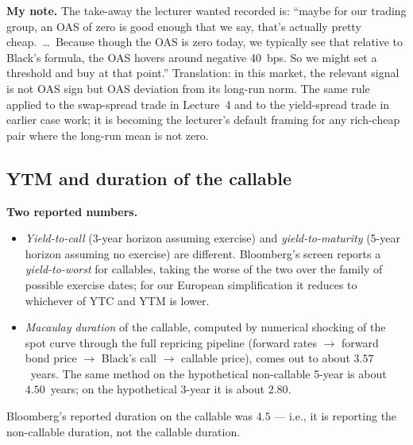 \begin{checkpoint}
\textbf{My note.} The take-away the lecturer wanted recorded is:
``maybe for our trading group, an OAS of zero is good enough that we
say, that's actually pretty cheap.\ \ldots\ Because though the OAS is
zero today, we typically see that relative to Black's formula, the
OAS hovers around negative 40~bps. So we might set a threshold and
buy at that point.'' Translation: in this market, the relevant signal
is not OAS sign but OAS deviation from its long-run norm. The same
rule applied to the swap-spread trade in Lecture~4 and to the
yield-spread trade in earlier case work; it is becoming the lecturer's
default framing for any rich-cheap pair where the long-run mean is
not zero.
\end{checkpoint}

\subsection{YTM and duration of the callable}\label{L6-sec:freddie-dur}

\begin{keyblock}
\textbf{Two reported numbers.}
\begin{itemize}
  \item \emph{Yield-to-call} (3-year horizon assuming exercise) and
        \emph{yield-to-maturity} (5-year horizon assuming no exercise)
        are different. Bloomberg's screen reports a
        \emph{yield-to-worst} for callables, taking the worse of the
        two over the family of possible exercise dates; for our
        European simplification it reduces to whichever of YTC and
        YTM is lower.
  \item \emph{Macaulay duration} of the callable, computed by
        numerical shocking of the spot curve through the full
        repricing pipeline (forward rates $\to$ forward bond price
        $\to$ Black's call $\to$ callable price), comes out to about
        $\mathbf{3.57}$~years. The same method on the hypothetical
        non-callable 5-year is about $\mathbf{4.50}$~years; on the
        hypothetical 3-year it is about $\mathbf{2.80}$.
\end{itemize}
Bloomberg's reported duration on the callable was $4.5$ --- i.e., it
is reporting the non-callable duration, not the callable duration.
\end{keyblock}

